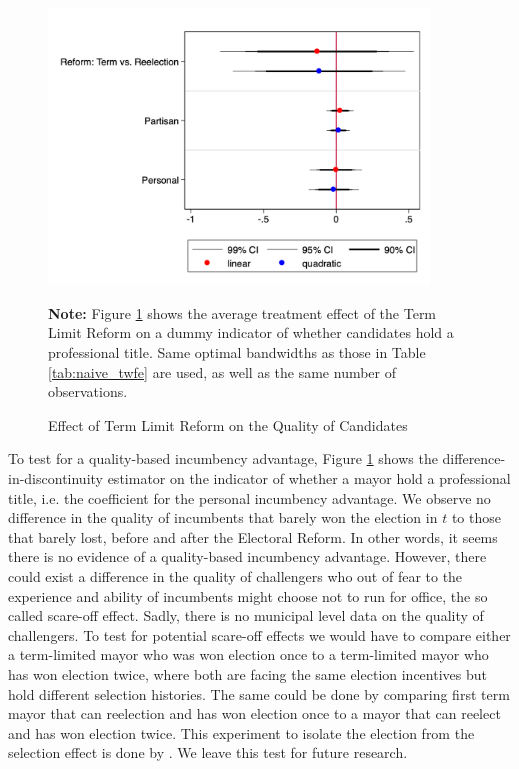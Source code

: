  \begin{figure}[H]   
\centering
 \caption{Effect of Term Limit Reform on the Quality of Candidates}
 \label{fig:quality_trend}
\includegraphics[width=0.9\textwidth]{Chapter2/Figures_incumbency/quality.png}
       \captionsetup{justification=centering}
         
 \textbf{Note:} Figure \ref{fig:quality_trend} shows the average treatment effect of the Term Limit Reform on a dummy indicator of whether candidates hold a professional title. Same optimal bandwidths as those in Table \ref{tab:naive_twfe} are used, as well as the same number of observations.   
     
\end{figure}   

To test for a quality-based incumbency advantage, Figure \ref{fig:quality_trend} shows the difference-in-discontinuity estimator on the indicator of whether a mayor hold a professional title, i.e. the coefficient for the personal incumbency advantage. We observe no difference in the quality of incumbents that barely won the election in $t$ to those that barely lost, before and after the Electoral Reform. In other words, it seems there is no evidence of a quality-based incumbency advantage. However, there could exist a difference in the quality of challengers who out of fear to the experience and ability of incumbents might choose not to run for office, the so called scare-off effect. Sadly, there is no municipal level data on the quality of challengers. To test for potential scare-off effects we would have to compare either a term-limited mayor who was won election once to a term-limited mayor who has won election twice, where both are facing the same election incentives but hold different selection histories. The same could be done by comparing first term mayor that can reelection and has won election once to a mayor that can reelect and has won election twice. This experiment to isolate the election from the selection effect is done by \citet{ashworth_2012}. We leave this test for future research.

